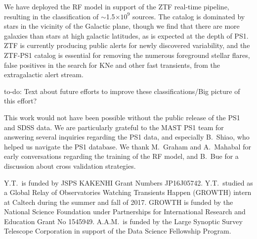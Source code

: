 \documentclass[twocolumn, dvipdfmx]{aastex62}
\newcommand{\todo}[1]{{\color{magenta} to-do: {#1}}}
\begin{document}
We have deployed the RF model in support of the ZTF real-time pipeline,
resulting in the classification of $\sim$1.5$\times 10^{9}$ sources. The
catalog is dominated by stars in the vicinity of the Galactic plane, though
we find that there are more galaxies than stars at high galactic latitudes,
as is expected at the depth of PS1. ZTF is currently producing public alerts
for newly discovered variability, and the ZTF-PS1 catalog is essential for
removing the numerous foreground stellar flares, false positives in the
search for KNe and other fast transients, from the extragalactic alert
stream.

\todo{Text about future efforts to improve these classifications/Big picture of this effort?}


\acknowledgements

This work would not have been possible without the public release of the PS1
and SDSS data. We are particularly grateful to the MAST PS1 team for
answering several inquiries regarding the PS1 data, and especially B.~Shiao,
who helped us navigate the PS1 database. We thank M.~Graham and A.~Mahabal
for early conversations regarding the training of the RF model, and B.~Bue
for a discussion about cross validation strategies.

Y.T.\ is funded by JSPS KAKENHI Grant Numbers JP16J05742. Y.T.\ studied as a
Global Relay of Observatories Watching Transients Happen (GROWTH) intern at
Caltech during the summer and fall of 2017. GROWTH is funded by the National
Science Foundation under Partnerships for International Research and
Education Grant No 1545949. A.A.M.\ is funded by the Large Synoptic Survey
Telescope Corporation in support of the Data Science Fellowship Program.








\end{document}
